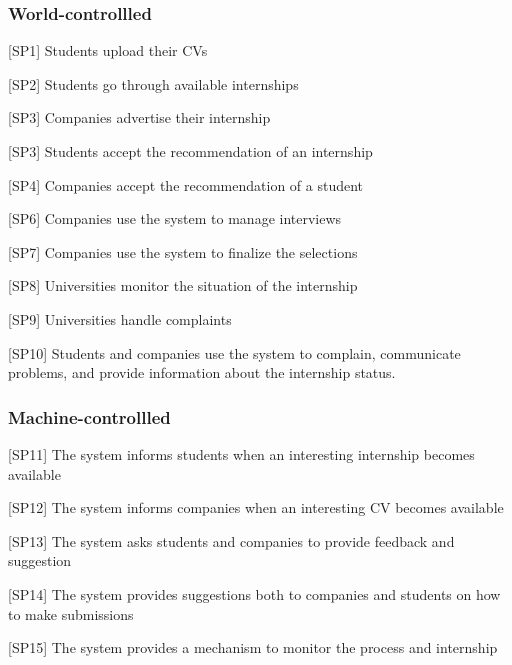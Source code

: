 \subsubsection{World-controllled}
[SP1] Students upload their CVs

[SP2] Students go through available internships

[SP3] Companies advertise their internship

[SP3] Students accept the recommendation of an internship

[SP4] Companies accept the recommendation of a student

[SP6] Companies use the system to manage interviews

[SP7] Companies use the system to finalize the selections

[SP8] Universities monitor the situation of the internship

[SP9] Universities handle complaints

[SP10] Students and companies use the system to complain, communicate problems, and provide information about the internship status.

\subsubsection{Machine-controllled}
[SP11] The system informs students when an interesting internship becomes available

[SP12] The system informs companies when an interesting CV becomes available

[SP13] The system asks students and companies to provide feedback and suggestion

[SP14] The system provides suggestions both to companies and students on how to make submissions

[SP15] The system provides a mechanism to monitor the process and internship


